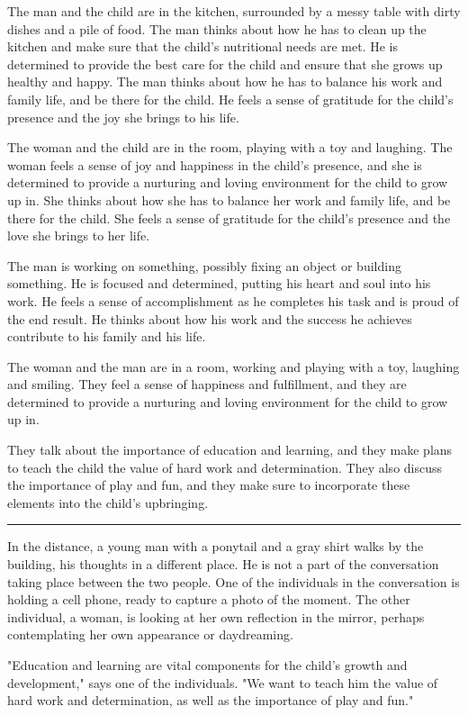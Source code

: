 \documentclass[smalldemyvopaper,11pt,twoside,onecolumn,openright,extrafontsizes]{memoir}
\begin{document}
The man and the child are in the kitchen, surrounded by a messy table with dirty dishes and a pile of food. The man thinks about how he has to clean up the kitchen and make sure that the child's nutritional needs are met. He is determined to provide the best care for the child and ensure that she grows up healthy and happy. The man thinks about how he has to balance his work and family life, and be there for the child. He feels a sense of gratitude for the child's presence and the joy she brings to his life.\par
The woman and the child are in the room, playing with a toy and laughing. The woman feels a sense of joy and happiness in the child's presence, and she is determined to provide a nurturing and loving environment for the child to grow up in. She thinks about how she has to balance her work and family life, and be there for the child. She feels a sense of gratitude for the child's presence and the love she brings to her life.\par
The man is working on something, possibly fixing an object or building something. He is focused and determined, putting his heart and soul into his work. He feels a sense of accomplishment as he completes his task and is proud of the end result. He thinks about how his work and the success he achieves contribute to his family and his life.\par
The woman and the man are in a room, working and playing with a toy, laughing and smiling. They feel a sense of happiness and fulfillment, and they are determined to provide a nurturing and loving environment for the child to grow up in.\par
They talk about the importance of education and learning, and they make plans to teach the child the value of hard work and determination. They also discuss the importance of play and fun, and they make sure to incorporate these elements into the child's upbringing.\par
\fancybreak{* * *}
In the distance, a young man with a ponytail and a gray shirt walks by the building, his thoughts in a different place. He is not a part of the conversation taking place between the two people. One of the individuals in the conversation is holding a cell phone, ready to capture a photo of the moment. The other individual, a woman, is looking at her own reflection in the mirror, perhaps contemplating her own appearance or daydreaming.\par
"Education and learning are vital components for the child's growth and development," says one of the individuals. "We want to teach him the value of hard work and determination, as well as the importance of play and fun."\par
\end{document}
